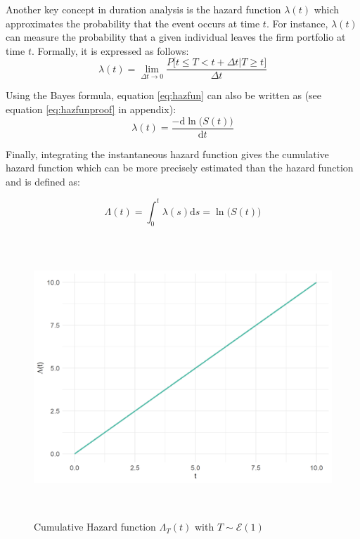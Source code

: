 \documentclass[
]{book}
\begin{document}
Another key concept in duration analysis is the hazard function \(\lambda(t)\) which approximates the probability that the event occurs at time \(t\). For instance, \(\lambda(t)\) can measure the probability that a given individual leaves the firm portfolio at time \(t\). Formally, it is expressed as follows:
\begin{equation}
  \lambda(t) = \lim_{\Delta t \to 0} \frac{P\big[t \leq T < t + \Delta t | T \geq t \big]}{\Delta t}
  \label{eq:hazfun}
\end{equation}

Using the Bayes formula, equation \eqref{eq:hazfun} can also be written as (see equation \eqref{eq:hazfunproof} in appendix):
\begin{equation}
  \lambda(t) = \frac{-\text{d} \ln \big(S(t)\big)}{\text{d} t}
  \label{eq:hazfunbis}
\end{equation}

Finally, integrating the instantaneous hazard function gives the cumulative hazard function which can be more precisely estimated than the hazard function \citep{CAMERON_TRIVEDI} and is defined as:

\begin{equation}
  \Lambda (t) = \int_{0}^{t} \lambda(s) \text{d}s = \ln \big(S(t)\big)
  \label{eq:cumhazfun}
\end{equation}

\begin{figure}

{\centering \includegraphics[width=400pt,height=300pt]{./imgs/cum_haz_plot} 

}

\caption{Cumulative Hazard function $\Lambda_T(t)$ with $T \sim \mathcal{E} (1)$}\label{fig:cumhazplot}
\end{figure}
\end{document}
